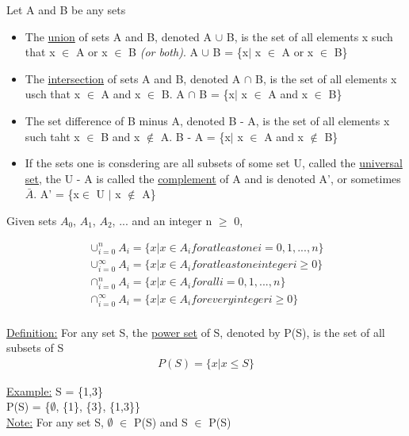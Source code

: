 \documentclass{article}
\begin{document}
Let A and B be any sets
\begin{itemize}
\item The \underline{union} of sets A and B, denoted A $\cup$ B, is the set of all elements x such that x $\in$ A or x $\in$ B
\textit{(or both)}. A $\cup$ B = \{x$|$ x $\in$ A or x $\in$ B\}

\item The \underline{intersection} of sets A and B, denoted A $\cap$ B, is the set of all elements x usch that x $\in$ A and x $\in$ B.
A $\cap$ B = \{x$|$ x $\in$ A and x $\in$ B\}

\item The set difference of B minus A, denoted B - A, is the set of all elements x such taht x $\in$ B and x $\notin$ A. 
B - A = \{x$|$ x $\in$ A and x $\notin$ B\}

\item If the sets one is consdering are all subsets of some set U, called the \underline{universal set}, the U - A is called the
\underline{complement} of A and is denoted A', or sometimes $\bar{A}$.
A' = \{x$\in$ U $|$ x $\notin$ A\}
\end{itemize}

Given sets $A_{0}$, $A_{1}$, $A_{2}$, ... and an integer n $\geq$ 0,

\begin{align}
\cup_{i=0}^{n} A_{i} = \{x | x \in A_{i} for at least one i = 0, 1, ..., n\} \\
\cup_{i=0}^{\infty} A_{i} = \{x | x \in A_{i} for at least one integer i \geq 0\} \\
\cap_{i=0}^{n} A_{i} = \{x | x \in A_{i} for all  i = 0, 1, ..., n\} \\
\cap_{i=0}^{\infty} A_{i} = \{x | x \in A_{i} for every integer i \geq 0\} \\
\end{align}

\underline{Definition:} For any set S, the \underline{power set} of S, denoted by P(S), is the set of all subsets of S
\begin{align}
P(S) = \{x | x \leq S\}
\end{align}

\underline{Example:} S = \{1,3\} \\
P(S) = \{$\emptyset$, \{1\}, \{3\}, \{1,3\}\} \\

\underline{Note:} For any set S, $\emptyset$ $\in$ P(S) and S $\in$ P(S) \\
\end{document}
